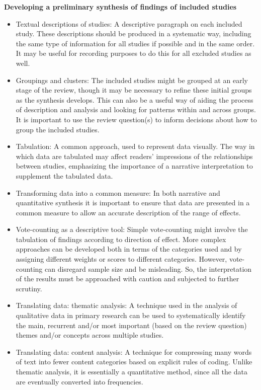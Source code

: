 \documentclass[
  10pt,
  a4paper,
  DIV=11,
  numbers=noendperiod]{scrreprt}
\begin{document}
\textbf{Developing a preliminary synthesis of findings of included
studies}

\begin{itemize}
\item
  Textual descriptions of studies: A descriptive paragraph on each
  included study. These descriptions should be produced in a systematic
  way, including the same type of information for all studies if
  possible and in the same order. It may be useful for recording
  purposes to do this for all excluded studies as well.
\item
  Groupings and clusters: The included studies might be grouped at an
  early stage of the review, though it may be necessary to refine these
  initial groups as the synthesis develops. This can also be a useful
  way of aiding the process of description and analysis and looking for
  patterns within and across groups. It is important to use the review
  question(s) to inform decisions about how to group the included
  studies.
\item
  Tabulation: A common approach, used to represent data visually. The
  way in which data are tabulated may affect readers' impressions of the
  relationships between studies, emphasizing the importance of a
  narrative interpretation to supplement the tabulated data.
\item
  Transforming data into a common measure: In both narrative and
  quantitative synthesis it is important to ensure that data are
  presented in a common measure to allow an accurate description of the
  range of effects.
\item
  Vote-counting as a descriptive tool: Simple vote-counting might
  involve the tabulation of findings according to direction of effect.
  More complex approaches can be developed both in terms of the
  categories used and by assigning different weights or scores to
  different categories. However, vote-counting can disregard sample size
  and be misleading. So, the interpretation of the results must be
  approached with caution and subjected to further scrutiny.
\item
  Translating data: thematic analysis: A technique used in the analysis
  of qualitative data in primary research can be used to systematically
  identify the main, recurrent and/or most important (based on the
  review question) themes and/or concepts across multiple studies.
\item
  Translating data: content analysis: A technique for compressing many
  words of text into fewer content categories based on explicit rules of
  coding. Unlike thematic analysis, it is essentially a quantitative
  method, since all the data are eventually converted into frequencies.
\end{itemize}
\end{document}
